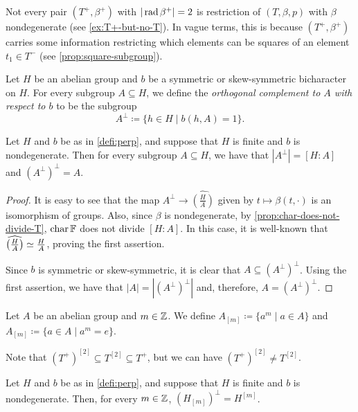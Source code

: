 
Not every pair $(T^+, \beta^+)$ with $|\operatorname{rad} \beta^+| = 2$ is restriction of $(T, \beta, p)$ with $\beta$ nondegenerate (see \cref{ex:T+-but-no-T}). 
In vague terms, this is because $(T^+, \beta^+)$ carries some information restricting which elements can be squares of an element $t_1 \in T^-$ (see \cref{prop:square-subgroup}). 

\begin{defi}\label{defi:perp}
    Let $H$ be an abelian group and $b$ be a symmetric or skew-symmetric bicharacter on $H$. 
    For every subgroup $A \subseteq H$, we define the \emph{orthogonal complement to $A$ with respect to $b$} to be the subgroup
    \[
        A^\perp \coloneqq \{ h\in H \mid b(h, A) = 1 \}.
    \]
\end{defi}

\begin{lemma}\label{lemma:perp-perp}
    Let $H$ and $b$ be as in \cref{defi:perp}, and suppose that $H$ is finite and $b$ is nondegenerate. 
    Then for every subgroup $A \subseteq H$, we have that $|A^\perp| = [H : A]$ and $(A^\perp)^\perp = A$.
\end{lemma}

\begin{proof}
    It is easy to see that the map $A^\perp \to \widehat{\left( \frac{H}{A}\right)}$ given by $t \mapsto \beta(t, \cdot)$ is an isomorphism of groups. 
    Also, since $\beta$ is nondegenerate, by \cref{prop:char-does-not-divide-T},  $\operatorname{char} \mathbb{F}$ does not divide $[H : A]$. 
    In this case, it is well-known that $\widehat{\left( \frac{H}{A}\right)} \simeq \frac{H}{A}$, proving the first assertion.

    Since $b$ is symmetric or skew-symmetric, it is clear that $A \subseteq (A^\perp)^\perp$. 
    Using the first assertion, we have that $|A| = |(A^\perp)^\perp|$ and, therefore, $A = (A^\perp)^\perp$.
\end{proof}

\begin{defi}
    Let $A$ be an abelian group and $m \in \mathbb{Z}$. 
    We define $A_{[m]} \coloneqq \{a^m \mid a\in A\}$ and $A_{[m]} \coloneqq \{a\in A \mid a^m = e \}$.
\end{defi}

Note that $(T^+)^{[2]} \subseteq T^{[2]} \subseteq T^+$, but we can have $(T^+)^{[2]} \neq T^{[2]}$. 

\begin{lemma}\label{lemma:small-perp}
    Let $H$ and $b$ be as in \cref{defi:perp}, and suppose that $H$ is finite and $b$ is nondegenerate.
    Then, for every $m\in \mathbb{Z}$, $(H_{[m]})^\perp = H^{[m]}$.
\end{lemma}

